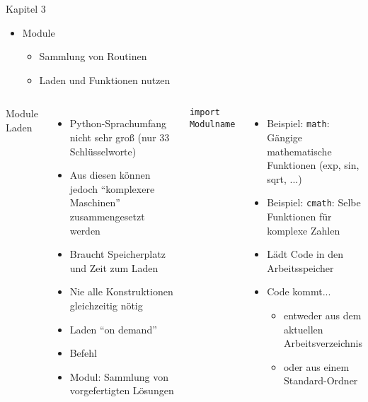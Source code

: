 
\begin{frame}{Kapitel 3}
%
\begin{itemize}
\item Module
	\begin{itemize}
	\item Sammlung von Routinen
	\item Laden und Funktionen nutzen
	\end{itemize}
\end{itemize}
%
\end{frame}


\begin{frame}[fragile]
%
\begin{columns}
\begin{Large}
Module Laden
\vspace{6pt}
\end{Large}
\begin{itemize}
\item Python-Sprachumfang nicht sehr groß (nur 33 Schlüsselworte)
\item Aus diesen können jedoch \enquote{komplexere Maschinen} zusammengesetzt werden
\item Braucht Speicherplatz und Zeit zum Laden
\item Nie alle Konstruktionen gleichzeitig nötig
\item[\Thus] Laden \enquote{on demand}
\item[\Thus] Befehl 
\item Modul: Sammlung von vorgefertigten Lösungen
\end{itemize}
%
\begin{codebox}
\begin{verbatim}
import Modulname
\end{verbatim}
\end{codebox}
\begin{itemize}
\item Beispiel: \texttt{math}: Gängige mathematische Funktionen (exp, sin, sqrt, ...)
\item Beispiel: \texttt{cmath}: Selbe Funktionen für komplexe Zahlen
\item Lädt Code in den Arbeitsspeicher
\item Code kommt...
	\begin{itemize}
	\item entweder aus dem aktuellen Arbeitsverzeichnis
	\item oder aus einem Standard-Ordner
	\end{itemize}
\end{itemize}
\end{columns}
%
\end{frame}

